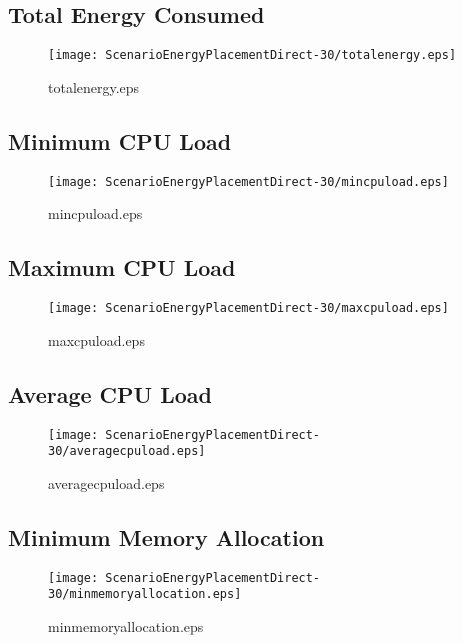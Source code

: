 \documentclass{elsart}
\begin{document}
\clearpage
\subsection{Total Energy Consumed}

\begin{figure}[ht]
\centering
\texttt{[image: ScenarioEnergyPlacementDirect-30/totalenergy.eps]}
\caption{totalenergy.eps}\label{fig:totalenergy}
\end{figure}

\clearpage
\subsection{Minimum CPU Load}

\begin{figure}[ht]
\centering
\texttt{[image: ScenarioEnergyPlacementDirect-30/mincpuload.eps]}
\caption{mincpuload.eps}\label{fig:mincpuload}
\end{figure}

\clearpage
\subsection{Maximum CPU Load}

\begin{figure}[ht]
\centering
\texttt{[image: ScenarioEnergyPlacementDirect-30/maxcpuload.eps]}
\caption{maxcpuload.eps}\label{fig:maxcpuload}
\end{figure}

\clearpage
\subsection{Average CPU Load}

\begin{figure}[ht]
\centering
\texttt{[image: ScenarioEnergyPlacementDirect-30/averagecpuload.eps]}
\caption{averagecpuload.eps}\label{fig:averagecpuload}
\end{figure}

\clearpage
\subsection{Minimum Memory Allocation}

\begin{figure}[ht]
\centering
\texttt{[image: ScenarioEnergyPlacementDirect-30/minmemoryallocation.eps]}
\caption{minmemoryallocation.eps}\label{fig:minmemoryallocation}
\end{figure}
\end{document}
